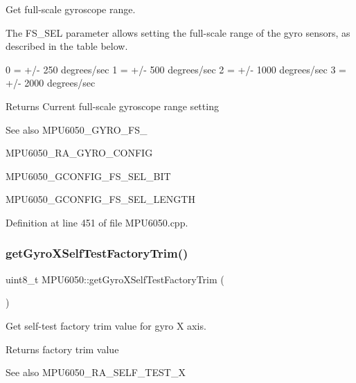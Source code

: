 Get full-\/scale gyroscope range. 

The F\+S\+\_\+\+S\+EL parameter allows setting the full-\/scale range of the gyro sensors, as described in the table below.


\begin{DoxyPre}
0 = +/- 250 degrees/sec
1 = +/- 500 degrees/sec
2 = +/- 1000 degrees/sec
3 = +/- 2000 degrees/sec
\end{DoxyPre}


\begin{DoxyReturn}{Returns}
Current full-\/scale gyroscope range setting 
\end{DoxyReturn}
\begin{DoxySeeAlso}{See also}
M\+P\+U6050\+\_\+\+G\+Y\+R\+O\+\_\+\+F\+S\+\_ 

M\+P\+U6050\+\_\+\+R\+A\+\_\+\+G\+Y\+R\+O\+\_\+\+C\+O\+N\+F\+IG 

M\+P\+U6050\+\_\+\+G\+C\+O\+N\+F\+I\+G\+\_\+\+F\+S\+\_\+\+S\+E\+L\+\_\+\+B\+IT 

M\+P\+U6050\+\_\+\+G\+C\+O\+N\+F\+I\+G\+\_\+\+F\+S\+\_\+\+S\+E\+L\+\_\+\+L\+E\+N\+G\+TH 
\end{DoxySeeAlso}


Definition at line 451 of file M\+P\+U6050.\+cpp.

\mbox{\label{classMPU6050_a9e50a2644c5ac8c9ac4270c86fd18a93}} 
\subsubsection{\texorpdfstring{getGyroXSelfTestFactoryTrim()}{getGyroXSelfTestFactoryTrim()}}
{\footnotesize\ttfamily uint8\+\_\+t M\+P\+U6050\+::get\+Gyro\+X\+Self\+Test\+Factory\+Trim (\begin{DoxyParamCaption}{ }\end{DoxyParamCaption})}



Get self-\/test factory trim value for gyro X axis. 

\begin{DoxyReturn}{Returns}
factory trim value 
\end{DoxyReturn}
\begin{DoxySeeAlso}{See also}
M\+P\+U6050\+\_\+\+R\+A\+\_\+\+S\+E\+L\+F\+\_\+\+T\+E\+S\+T\+\_\+X 
\end{DoxySeeAlso}



